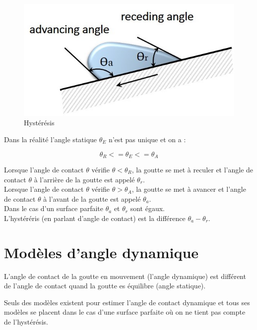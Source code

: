 \begin{figure}[ht]
	\label{fig:hysteresis}
	\centering
	\includegraphics[scale = 0.8]{./image/hysteresis.jpg}
	\caption{Hystérésis}
\end{figure}
Dans la réalité l'angle statique $\theta_{E}$ n'est pas unique et on a :

\begin{equation}
	\theta_{R} <= \theta_{E} <= \theta_{A}
\end{equation}

Lorsque l'angle de contact $\theta$ vérifie $\theta < \theta_{R}$, la goutte se met à reculer et l'angle de contact $\theta$ à l'arrière de la goutte est appelé $\theta_{r}$.\\

Lorsque l'angle de contact $\theta$ vérifie $\theta > \theta_{A}$, la goutte se met à avancer et l'angle de contact $\theta$ à l'avant de la goutte est appelé $\theta_{a}$.\\

Dans le cas d'un surface parfaite $\theta_{a}$ et $\theta_{r}$ sont égaux.\\

L'hystéréris (en parlant d'angle de contact) est la différence $\theta_{a}-\theta_{r}$.

\section{Modèles d'angle dynamique}

L'angle de contact de la goutte en mouvement (l'angle dynamique) est différent de l'angle de contact quand la goutte es équilibre (angle statique).

Seuls des modèles existent pour estimer l'angle de contact dynamique et tous ses modèles se placent dans le cas d'une surface parfaite où on ne tient pas compte de l'hystérésis. 

